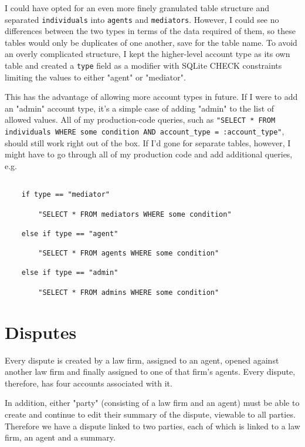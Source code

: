 I could have opted for an even more finely granulated table structure and separated \lstinline{individuals} into \lstinline{agents} and \lstinline{mediators}. However, I could see no differences between the two types in terms of the data required of them, so these tables would only be duplicates of one another, save for the table name. To avoid an overly complicated structure, I kept the higher-level account type as its own table and created a \lstinline{type} field as a modifier with SQLite CHECK constraints limiting the values to either "agent" or "mediator".

This has the advantage of allowing more account types in future. If I were to add an "admin" account type, it's a simple case of adding "admin" to the list of allowed values. All of my production-code queries, such as \lstinline{"SELECT * FROM individuals WHERE some condition AND account_type = :account_type"}, should still work right out of the box. If I'd gone for separate tables, however, I might have to go through all of my production code and add additional queries, e.g.

\begin{lstlisting}

    if type == "mediator"
    
        "SELECT * FROM mediators WHERE some condition"
    
    else if type == "agent"
    
        "SELECT * FROM agents WHERE some condition"
    
    else if type == "admin"
    
        "SELECT * FROM admins WHERE some condition"

\end{lstlisting}

\section{Disputes}

Every dispute is created by a law firm, assigned to an agent, opened against another law firm and finally assigned to one of that firm's agents. Every dispute, therefore, has four accounts associated with it.

In addition, either "party" (consisting of a law firm and an agent) must be able to create and continue to edit their summary of the dispute, viewable to all parties. Therefore we have a dispute linked to two parties, each of which is linked to a law firm, an agent and a summary.

